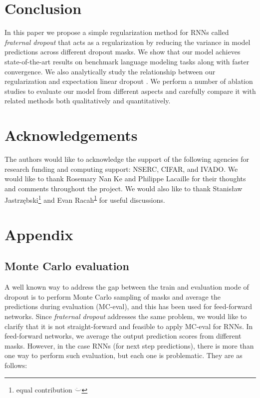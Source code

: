 \documentclass{article} %
\begin{document}
\section{Conclusion}
In this paper we propose a simple regularization method for RNNs called \emph{fraternal dropout} that acts as a regularization by reducing the variance in model predictions across different dropout masks. We show that our model achieves state-of-the-art results on benchmark language modeling tasks along with faster convergence. We also analytically study the relationship between our regularization and expectation linear dropout \cite{ma2016dropout}. We perform a number of ablation studies to evaluate our model from different aspects and carefully compare it with related methods both qualitatively and quantitatively.

\ificlrfinal
\section*{Acknowledgements}
\setcounter{footnote}{1}
\def\thefootnote{\fnsymbol{footnote}}
The authors would like to acknowledge the support of the following agencies for research funding and computing support: NSERC, CIFAR, and IVADO. We would like to thank Rosemary Nan Ke and Philippe Lacaille for their thoughts and comments throughout the project. We would also like to thank Stanis\l{}aw Jastrz\k{e}bski\footnote{\label{eq_con}equal contribution $\ddot\smile$} and Evan Racah\textsuperscript{\ref{eq_con}} for useful discussions.
\fi




\newpage
\appendix

\section*{Appendix}
\subsection*{Monte Carlo evaluation}

A well known way to address the gap between the train and evaluation mode of dropout is to perform Monte Carlo sampling of masks and average the predictions during evaluation (MC-eval), and this has been used for feed-forward networks. Since \emph{fraternal dropout} addresses the same problem, we would like to clarify that it is not straight-forward and feasible to apply MC-eval for RNNs. In feed-forward networks, we average the output prediction scores from different masks. However, in the case RNNs (for next step predictions), there is more than one way to perform such evaluation, but each one is problematic. They are as follows:
\end{document}
